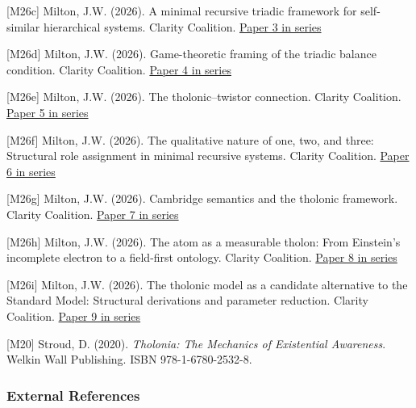 \documentclass[
  11pt,
  letterpaper,
]{article}
\begin{document}
{[}M26c{]} Milton, J.W. (2026). A minimal recursive triadic framework
for self-similar hierarchical systems. Clarity Coalition.
\href{https://github.com/baardev/truevalue/blob/main/docnav/Research/papers/3_minimal-recursive-triadic-framework/3_minimal-recursive-triadic-framework.pdf}{Paper
3 in series}

{[}M26d{]} Milton, J.W. (2026). Game-theoretic framing of the triadic
balance condition. Clarity Coalition.
\href{https://github.com/baardev/truevalue/blob/main/docnav/Research/papers/4_game-theoretic-triadic-balance/4_game-theoretic-triadic-balance.pdf}{Paper
4 in series}

{[}M26e{]} Milton, J.W. (2026). The tholonic--twistor connection.
Clarity Coalition.
\href{https://github.com/baardev/truevalue/blob/main/docnav/Research/papers/5_tholonic-twistor-connection/5_tholonic-twistor-connection.pdf}{Paper
5 in series}

{[}M26f{]} Milton, J.W. (2026). The qualitative nature of one, two, and
three: Structural role assignment in minimal recursive systems. Clarity
Coalition.
\href{https://github.com/baardev/truevalue/blob/main/docnav/Research/papers/6_qualitative-nature-integers-triadic-roles/6_qualitative-nature-integers-triadic-roles.pdf}{Paper
6 in series}

{[}M26g{]} Milton, J.W. (2026). Cambridge semantics and the tholonic
framework. Clarity Coalition.
\href{https://github.com/baardev/truevalue/blob/main/docnav/Research/papers/7_cambridge-semantics-tholonic-framework/7_cambridge-semantics-tholonic-framework.pdf}{Paper
7 in series}

{[}M26h{]} Milton, J.W. (2026). The atom as a measurable tholon: From
Einstein's incomplete electron to a field-first ontology. Clarity
Coalition.
\href{https://github.com/baardev/truevalue/blob/main/docnav/Research/papers/8_atom-as-tholon-measurable-phenomena/8_atom-as-tholon-measurable-phenomena.pdf}{Paper
8 in series}

{[}M26i{]} Milton, J.W. (2026). The tholonic model as a candidate
alternative to the Standard Model: Structural derivations and parameter
reduction. Clarity Coalition.
\href{https://github.com/baardev/truevalue/blob/main/docnav/Research/papers/9_tholonic-model-standard-model-alternative/9_tholonic-model-standard-model-alternative.pdf}{Paper
9 in series}

{[}M20{]} Stroud, D. (2020). \emph{Tholonia: The Mechanics of
Existential Awareness}. Welkin Wall Publishing. ISBN 978-1-6780-2532-8.

\subsubsection{External References}\label{external-references}
\end{document}

